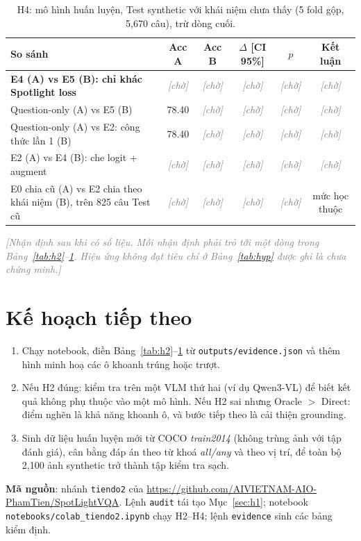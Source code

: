 \documentclass[12pt]{ai_conquer2026}
\newcommand{\fillin}[1]{\textcolor{gray}{\textit{[#1]}}}
\newcommand{\tbd}{\fillin{chờ}}
\begin{document}
\begin{table}[h!]
\centering
\small
\caption{H4: mô hình huấn luyện, Test synthetic với khái niệm chưa thấy (5 fold gộp, 5{,}670 câu), trừ dòng cuối.}
\label{tab:h4}
\begin{tabular}{|l|c|c|c|c|c|}
\hline
\textbf{So sánh} & \textbf{Acc A} & \textbf{Acc B} & \textbf{$\Delta$ [CI 95\%]} & \textbf{$p$} & \textbf{Kết luận} \\ \hline
\textbf{E4 (A) vs E5 (B): chỉ khác Spotlight loss} & \tbd & \tbd & \tbd & \tbd & \tbd \\
Question-only (A) vs E5 (B) & 78.40 & \tbd & \tbd & \tbd & \tbd \\
Question-only (A) vs E2: công thức lần 1 (B) & 78.40 & \tbd & \tbd & \tbd & \tbd \\
E2 (A) vs E4 (B): che logit + augment & \tbd & \tbd & \tbd & \tbd & \tbd \\
E0 chia cũ (A) vs E2 chia theo khái niệm (B), trên 825 câu Test cũ & \tbd & \tbd & \tbd & \tbd & mức học thuộc \\ \hline
\end{tabular}
\end{table}

\fillin{Nhận định sau khi có số liệu. Mỗi nhận định phải trỏ tới một dòng trong Bảng~\ref{tab:h2}--\ref{tab:h4}. Hiệu ứng không đạt tiêu chí ở Bảng~\ref{tab:hyp} được ghi là chưa chứng minh.}

\section{Kế hoạch tiếp theo}
\begin{enumerate}
    \item Chạy notebook, điền Bảng~\ref{tab:h2}--\ref{tab:h4} từ \texttt{outputs/evidence.json} và thêm hình minh hoạ các ô khoanh trúng hoặc trượt.
    \item Nếu H2 đúng: kiểm tra trên một VLM thứ hai (ví dụ Qwen3-VL) để biết kết quả không phụ thuộc vào một mô hình. Nếu H2 sai nhưng Oracle $>$ Direct: điểm nghẽn là khả năng khoanh ô, và bước tiếp theo là cải thiện grounding.
    \item Sinh dữ liệu huấn luyện mới từ COCO \emph{train2014} (không trùng ảnh với tập đánh giá), cân bằng đáp án theo từ khoá \emph{all/any} và theo vị trí, để toàn bộ 2{,}100 ảnh synthetic trở thành tập kiểm tra sạch.
\end{enumerate}

\noindent\textbf{Mã nguồn}: nhánh \texttt{tiendo2} của \url{https://github.com/AIVIETNAM-AIO-PhamTien/SpotLightVQA}. Lệnh \texttt{audit} tái tạo Mục~\ref{sec:h1}; notebook \texttt{notebooks/colab\_tiendo2.ipynb} chạy H2--H4; lệnh \texttt{evidence} sinh các bảng kiểm định.
\end{document}

